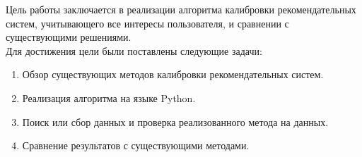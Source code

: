 

Цель работы заключается в реализации алгоритма
калибровки рекомендательных систем, учитывающего все интересы пользователя, и сравнении с существующими решениями.
\\

Для достижения цели были поставлены следующие задачи:
\begin{enumerate} 
    \item Обзор существующих методов калибровки рекомендательных систем.
    \item Реализация алгоритма на языке Python.
    \item Поиск или сбор данных и проверка реализованного метода на данных.
    \item Сравнение результатов с существующими методами.
  \end{enumerate}
  